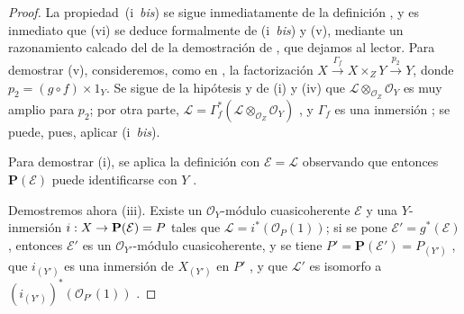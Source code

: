 \documentclass[oneside,10pt]{amsart}
\makeatletter
\newcommand{\ega@arrow}[2]{\mathchoice{#1}{#2}{#2}{#2}}
\renewcommand{\to}{\ega@arrow{\longrightarrow}{\rightarrow}}
\newcommand{\oldpage}[2][]{\marginnote{\normalfont\footnotesize\textbf{#1}~|~#2}\ignorespaces}
\makeatother
\begin{document}
\begin{proof}
La propiedad~(i~\emph{bis}) se sigue inmediatamente de la definición , y es inmediato que (vi) se deduce formalmente de (i~\emph{bis}) y (v), mediante un razonamiento calcado del de la demostración de , que dejamos al lector.
Para demostrar (v), consideremos, como en , la factorización $X\xrightarrow{\Gamma_f}X\times_ZY\xrightarrow{p_2}Y$, donde $p_2=(g\circ f)\times1_Y$.
Se sigue de la hipótesis y de (i) y (iv) que $\mathcal{L}\otimes_{\mathcal{O}_Z}\mathcal{O}_Y$ es muy amplio para $p_2$;
por otra parte, $\mathcal{L}=\Gamma_f^*(\mathcal{L}\otimes_{\mathcal{O}_Z}\mathcal{O}_Y)$ , y $\Gamma_f$ es una inmersión ;
se puede, pues, aplicar (i~\emph{bis}).

\oldpage[II]{82}
Para demostrar (i), se aplica la definición  con $\mathcal{E}=\mathcal{L}$ observando que entonces $\mathbf{P}(\mathcal{E})$ puede identificarse con $Y$ .

Demostremos ahora (iii).
Existe un $\mathcal{O}_Y$-módulo cuasicoherente $\mathcal{E}$ y una $Y$-inmersión $i:X\to\mathbf{P}(\mathcal{E})=P$ tales que $\mathcal{L}=i^*(\mathcal{O}_P(1))$;
si se pone $\mathcal{E}'=g^*(\mathcal{E})$, entonces $\mathcal{E}'$ es un $\mathcal{O}_{Y'}$-módulo cuasicoherente, y se tiene $P'=\mathbf{P}(\mathcal{E}')=P_{(Y')}$ , que $i_{(Y')}$ es una inmersión de $X_{(Y')}$ en $P'$ , y que $\mathcal{L}'$ es isomorfo a $(i_{(Y')})^*(\mathcal{O}_{P'}(1))$ .


\end{proof}
\end{document}
